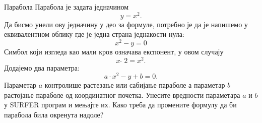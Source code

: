 \begin{surferPage}{Парабола}
Парабола је задата једначином  \[y=x^2.\]
Да бисмо унели ову једначину у део за формуле, потребно је да је напишемо у еквивалентном облику где је једна страна једнакости нула:
\[x^2-y=0\]
Симбол који изгледа као мали кров означава експонент, у овом случају  
\[ x  \,\hat{\ } \, 2 =x^2.\]
Додајемо два параметра:
\[a \cdot x^2-y+b=0.\]
Параметар $a$ контролише растезање или сабијање параболе а параметар  $b$ растојање параболе од координатног почетка.
\newline
Унесите вредности параметара  $a$ и $b$ у SURFER програм и мењајте их. Како треба да промените формулу да би парабола била окренута надоле?
\end{surferPage}
